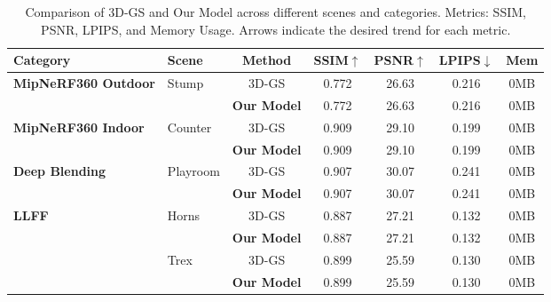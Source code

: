 
\begin{table}[h!]
    \centering
    \begin{tabular}{llccccc}
    \toprule
    \textbf{Category} & \textbf{Scene} & \textbf{Method} & \textbf{SSIM$\uparrow$} & \textbf{PSNR$\uparrow$} & \textbf{LPIPS$\downarrow$} & \textbf{Mem} \\
    \midrule
    \multirow{2}{*}{\textbf{MipNeRF360 Outdoor}} & 
        \multirow{2}{*}{Stump} 
        & 3D-GS & 0.772 & 26.63 & 0.216 & 0MB \\
        & & \textbf{Our Model} & 0.772 & 26.63 & 0.216 & 0MB \\
        \midrule
    \multirow{2}{*}{\textbf{MipNeRF360 Indoor}} & 
        \multirow{2}{*}{Counter} 
        & 3D-GS & 0.909 & 29.10 & 0.199 & 0MB \\
        & & \textbf{Our Model} & 0.909 & 29.10 & 0.199 & 0MB \\
        \midrule
    \multirow{2}{*}{\textbf{Deep Blending}} & 
        \multirow{2}{*}{Playroom} 
        & 3D-GS & 0.907 & 30.07 & 0.241 & 0MB \\
        & & \textbf{Our Model} & 0.907 & 30.07 & 0.241 & 0MB \\
        \midrule
    \multirow{4}{*}{\textbf{LLFF}} & 
        \multirow{2}{*}{Horns} 
        & 3D-GS & 0.887 & 27.21 & 0.132 & 0MB \\
        & & \textbf{Our Model} & 0.887 & 27.21 & 0.132 & 0MB \\
            \cmidrule{2-7} &
        \multirow{2}{*}{Trex} 
        & 3D-GS & 0.899 & 25.59 & 0.130 & 0MB \\
        & & \textbf{Our Model} & 0.899 & 25.59 & 0.130 & 0MB \\
    \bottomrule
    \end{tabular}
    \caption{Comparison of 3D-GS and Our Model across different scenes and categories. Metrics: SSIM, PSNR, LPIPS, and Memory Usage. Arrows indicate the desired trend for each metric.}
    \label{tab:comparison}
    \end{table}